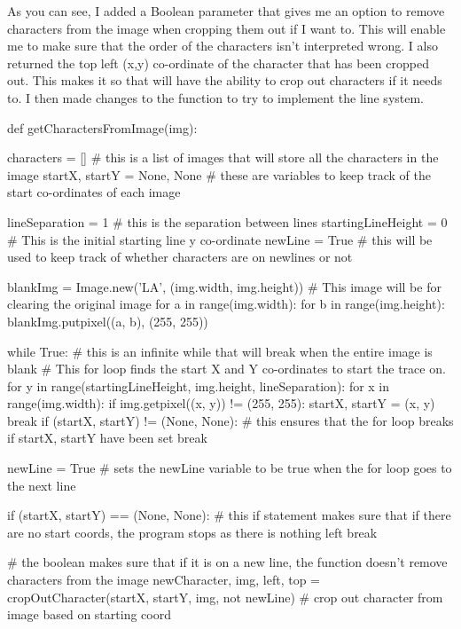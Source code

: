 \documentclass{report}
\begin{document}
As you can see, I added a Boolean parameter that gives me an option to remove characters from the image when cropping them out if I want to. This will enable me to make sure that the order of the characters isn't interpreted wrong. I also returned the top left (x,y) co-ordinate of the character that has been cropped out. This makes it so that  will have the ability to crop out characters if it needs to.
\newline
I then made changes to the  function to try to implement the line system.
\begin{python}
def getCharactersFromImage(img):

    characters = []  # this is a list of images that will store all the characters in the image
    startX, startY = None, None  # these are variables to keep track of the start co-ordinates of each image

    lineSeparation = 1  # this is the separation between lines
    startingLineHeight = 0  # This is the initial starting line y co-ordinate
    newLine = True  # this will be used to keep track of whether characters are on newlines or not

    blankImg = Image.new('LA', (img.width, img.height))  # This image will be for clearing the original image
    for a in range(img.width):
        for b in range(img.height):
            blankImg.putpixel((a, b), (255, 255))

    while True:  # this is an infinite while that will break when the entire image is blank
        #  This for loop finds the start X and Y co-ordinates to start the trace on.
        for y in range(startingLineHeight, img.height, lineSeparation):
            for x in range(img.width):
                if img.getpixel((x, y)) != (255, 255):
                    startX, startY = (x, y)
                    break
            if (startX, startY) != (None, None):  # this ensures that the for loop breaks if startX, startY have been set
                break

            newLine = True  # sets the newLine variable to be true when the for loop goes to the next line

        if (startX, startY) == (None, None):  # this if statement makes sure that if there are no start coords, the program stops as there is nothing left
            break

        # the boolean makes sure that if it is on a new line, the function doesn't remove characters from the image
        newCharacter, img, left, top = cropOutCharacter(startX, startY, img, not newLine)  # crop out character from image based on starting coord


\end{python}
\end{document}
